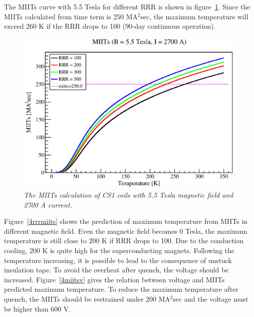 The MIITs curve with 5.5 Tesla for different RRR is shown in figure~\ref{4miits}.
Since the MIITs calculated from time term is 250 MA$^2$sec, the maximum temperature will exceed 260 K if the RRR drops to 100 (90-day continuous operation).
  \begin{figure}[H]
   \centering
   \includegraphics[scale=0.48]{chapter5/fig/I2700.eps}
   \caption{\it The MIITs calculation of CS1 coils with 5.5 Tesla magnetic field and 2700 A current.}
   \label{4miits}
  \end{figure}

Figure~\ref{4rrrmiits} shows the prediction of maximum temperature from MIITs in different magnetic field.
Even the magnetic field becomes 0 Tesla, the maximum temperature is still close to 200 K if RRR drops to 100.
Due to the conduction cooling, 200 K is quite high for the superconducting magnets.
Following the temperature increasing, it is possible to lead to the consequence of unstuck insulation tape.
To avoid the overheat after quench, the voltage should be increased.
Figure~\ref{4miitsv} gives the relation between voltage and MIITs predicted maximum temperature.
To reduce the maximum temperature after quench, the MIITs should be restrained under 200 MA$^2$sec and the voltage must be higher than 600 V.

